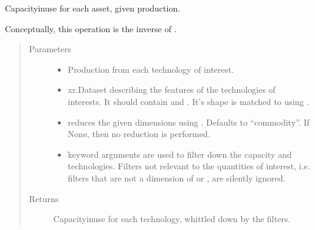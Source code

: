 \documentclass[letterpaper,10pt,english]{sphinxmanual}
\begin{document}

\begin{fulllineitems}
\label{\detokenize{api:muse.quantities.capacity_in_use}}
Capacity\sphinxhyphen{}in\sphinxhyphen{}use for each asset, given production.

Conceptually, this operation is the inverse of .
\begin{quote}\begin{description}
\item[{Parameters}] \leavevmode\begin{itemize}
\item {} 
 \textendash{} Production from each technology of interest.

\item {} 
 \textendash{} xr.Dataset describing the features of the technologies of
interests.  It should contain  and . It’s
shape is matched to  using .

\item {} 
 \textendash{} reduces the given dimensions using . Defaults to “commodity”. If
None, then no reduction is performed.

\item {} 
 \textendash{} keyword arguments are used to filter down the capacity and
technologies. Filters not relevant to the quantities of interest, i.e.
filters that are not a dimension of  or , are
silently ignored.

\end{itemize}

\item[{Returns}] \leavevmode
Capacity\sphinxhyphen{}in\sphinxhyphen{}use for each technology, whittled down by the filters.

\end{description}\end{quote}

\end{fulllineitems}
\end{document}
